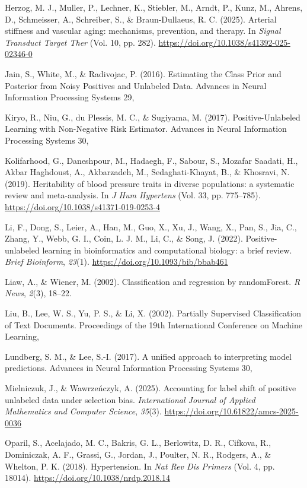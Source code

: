 \documentclass[10pt]{article}
\begin{document}
Herzog, M. J., Muller, P., Lechner, K., Stiebler, M., Arndt, P., Kunz,
M., Ahrens, D., Schmeisser, A., Schreiber, S., \& Braun-Dullaeus, R. C.
(2025). Arterial stiffness and vascular aging: mechanisms, prevention,
and therapy. In \emph{Signal Transduct Target Ther} (Vol. 10, pp. 282).
\url{https://doi.org/10.1038/s41392-025-02346-0}

Jain, S., White, M., \& Radivojac, P. (2016). Estimating the Class Prior
and Posterior from Noisy Positives and Unlabeled Data. Advances in
Neural Information Processing Systems 29,

Kiryo, R., Niu, G., du Plessis, M. C., \& Sugiyama, M. (2017).
Positive-Unlabeled Learning with Non-Negative Risk Estimator. Advances
in Neural Information Processing Systems 30,

Kolifarhood, G., Daneshpour, M., Hadaegh, F., Sabour, S., Mozafar
Saadati, H., Akbar Haghdoust, A., Akbarzadeh, M., Sedaghati-Khayat, B.,
\& Khosravi, N. (2019). Heritability of blood pressure traits in diverse
populations: a systematic review and meta-analysis. In \emph{J Hum
Hypertens} (Vol. 33, pp. 775--785).
\url{https://doi.org/10.1038/s41371-019-0253-4}

Li, F., Dong, S., Leier, A., Han, M., Guo, X., Xu, J., Wang, X., Pan,
S., Jia, C., Zhang, Y., Webb, G. I., Coin, L. J. M., Li, C., \& Song, J.
(2022). Positive-unlabeled learning in bioinformatics and computational
biology: a brief review. \emph{Brief Bioinform}, \emph{23}(1).
\url{https://doi.org/10.1093/bib/bbab461}

Liaw, A., \& Wiener, M. (2002). Classification and regression by
randomForest. \emph{R News}, \emph{2}(3), 18--22.

Liu, B., Lee, W. S., Yu, P. S., \& Li, X. (2002). Partially Supervised
Classification of Text Documents. Proceedings of the 19th International
Conference on Machine Learning,

Lundberg, S. M., \& Lee, S.-I. (2017). A unified approach to
interpreting model predictions. Advances in Neural Information
Processing Systems 30,

Mielniczuk, J., \& Wawrzeńczyk, A. (2025). Accounting for label shift of
positive unlabeled data under selection bias. \emph{International
Journal of Applied Mathematics and Computer Science}, \emph{35}(3).
\url{https://doi.org/10.61822/amcs-2025-0036}

Oparil, S., Acelajado, M. C., Bakris, G. L., Berlowitz, D. R., Cifkova,
R., Dominiczak, A. F., Grassi, G., Jordan, J., Poulter, N. R., Rodgers,
A., \& Whelton, P. K. (2018). Hypertension. In \emph{Nat Rev Dis
Primers} (Vol. 4, pp. 18014). \url{https://doi.org/10.1038/nrdp.2018.14}
\end{document}
